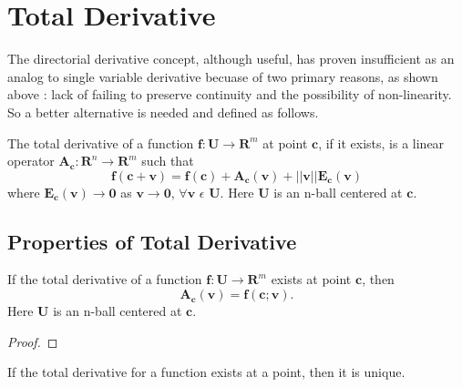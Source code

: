 \section{Total Derivative}
The directorial derivative concept, although useful, has proven insufficient as
an analog to single variable derivative becuase of two primary reasons, as shown
above : lack of failing to preserve continuity and the possibility of
non-linearity. So a better alternative is needed and defined as follows.
\begin{definition}
The total derivative of a function  $\bm{f} : \bm{U} \rightarrow \bm{R}^m$ at point
$\bm{c}$, if it exists, is a linear operator $\bm{A_{c}} : \bm{R}^n \rightarrow \bm{R}^m$ such
that
\[
\bm{f(c+v) = f(c) + A_{c}(v) + ||v||E_{c}(v)}
\]
where $\bm{E_{c}(v) \rightarrow 0}$ as $\bm{v\rightarrow 0}$, $\forall \bm{v}$
$\epsilon$ $\bm{U}$. Here $\bm{U}$ is an n-ball centered at $\bm{c}$.
\end{definition}

\subsection{Properties of Total Derivative}
\begin{theorem}
If the total derivative of a function $\bm{f} : \bm{U} \rightarrow \bm{R}^m$
exists at point $\bm{c}$, then
\[
\bm{A_{c}(v) = f(c;v)}.
\]
Here $\bm{U}$ is an n-ball centered at $\bm{c}$.
\end{theorem}
\begin{proof}
\end{proof}
\begin{corollary}
If the total derivative for a function exists at a point, then it is unique.
\end{corollary}
